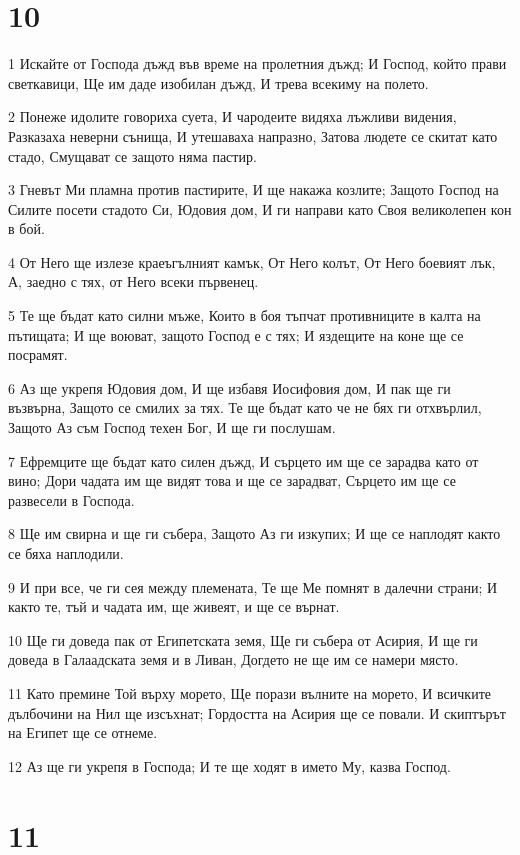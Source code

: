 \chapter{10}

\par 1 Искайте от Господа дъжд във време на пролетния дъжд; И Господ, който прави светкавици, Ще им даде изобилан дъжд, И трева всекиму на полето.
\par 2 Понеже идолите говориха суета, И чародеите видяха лъжливи видения, Разказаха неверни сънища, И утешаваха напразно, Затова людете се скитат като стадо, Смущават се защото няма пастир.
\par 3 Гневът Ми пламна против пастирите, И ще накажа козлите; Защото Господ на Силите посети стадото Си, Юдовия дом, И ги направи като Своя великолепен кон в бой.
\par 4 От Него ще излезе краеъгълният камък, От Него колът, От Него боевият лък, А, заедно с тях, от Него всеки първенец.
\par 5 Те ще бъдат като силни мъже, Които в боя тъпчат противниците в калта на пътищата; И ще воюват, защото Господ е с тях; И яздещите на коне ще се посрамят.
\par 6 Аз ще укрепя Юдовия дом, И ще избавя Иосифовия дом, И пак ще ги възвърна, Защото се смилих за тях. Те ще бъдат като че не бях ги отхвърлил, Защото Аз съм Господ техен Бог, И ще ги послушам.
\par 7 Ефремците ще бъдат като силен дъжд, И сърцето им ще се зарадва като от вино; Дори чадата им ще видят това и ще се зарадват, Сърцето им ще се развесели в Господа.
\par 8 Ще им свирна и ще ги събера, Защото Аз ги изкупих; И ще се наплодят както се бяха наплодили.
\par 9 И при все, че ги сея между племената, Те ще Ме помнят в далечни страни; И както те, тъй и чадата им, ще живеят, и ще се върнат.
\par 10 Ще ги доведа пак от Египетската земя, Ще ги събера от Асирия, И ще ги доведа в Галаадската земя и в Ливан, Догдето не ще им се намери място.
\par 11 Като премине Той върху морето, Ще порази вълните на морето, И всичките дълбочини на Нил ще изсъхнат; Гордостта на Асирия ще се повали. И скиптърът на Египет ще се отнеме.
\par 12 Аз ще ги укрепя в Господа; И те ще ходят в името Му, казва Господ.

\chapter{11}

